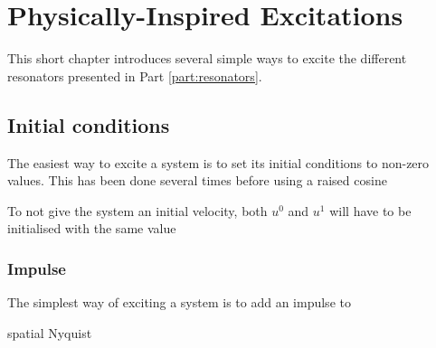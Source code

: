 \chapter{Physically-Inspired Excitations}\label{ch:physInspExcitations}
This short chapter introduces several simple ways to excite the different resonators presented in Part \ref{part:resonators}.

\section{Initial conditions}
The easiest way to excite a system is to set its initial conditions to non-zero values. This has been done several times before using a raised cosine 

To not give the system an initial velocity, both $u^0$ and $u^1$ will have to be initialised with the same value

\subsection{Impulse}
The simplest way of exciting a system is to add an impulse to 

spatial Nyquist

